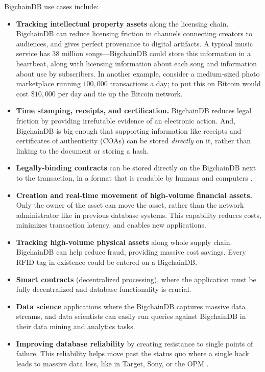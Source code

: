 BigchainDB use cases include:
\begin{itemize}
 \item \textbf{Tracking intellectual property assets} along the licensing chain. BigchainDB can reduce licensing friction in channels connecting creators to audiences, and gives perfect provenance to digital artifacts. A typical music service has $38$ million songs—BigchainDB could store this information in a heartbeat, along with licensing information about each song and information about use by subscribers. In another example, consider a medium-sized photo marketplace running $100,000$ transactions a day; to put this on Bitcoin would cost \$$10,000$ per day and tie up the Bitcoin network.
 \item \textbf{Time stamping, receipts, and certification.} BigchainDB reduces legal friction by providing irrefutable evidence of an electronic action. And, BigchainDB is big enough that supporting information like receipts and certificates of authenticity (COAs) can be stored \textit{directly} on it, rather than linking to the document or storing a hash.
 \item \textbf{Legally-binding contracts} can be stored directly on the BigchainDB next to the transaction, in a format that is readable by humans and computers \cite{grigg2004ricardian}.
 \item \textbf{Creation and real-time movement of high-volume financial assets.} Only the owner of the asset can move the asset, rather than the network administrator like in previous database systems. This capability reduces costs, minimizes transaction latency, and enables new applications.
 \item \textbf{Tracking high-volume physical assets} along whole supply chain. BigchainDB can help reduce fraud, providing massive cost savings. Every RFID tag in existence could be entered on a BigchainDB.
 \item \textbf{Smart contracts} (decentralized processing), where the application must be fully decentralized and database functionality is crucial.
 \item \textbf{Data science} applications where the BigchainDB captures massive data streams, and data scientists can easily run queries against BigchainDB in their data mining and analytics tasks.
 \item \textbf{Improving database reliability} by creating resistance to single points of failure. This reliability helps move past the status quo where a single hack leads to massive data loss, like in Target, Sony, or the OPM \cite{ojeda2014target_hack}\cite{bluestone2014sony_hack}\cite{davis2015hacking}.
\end{itemize}

